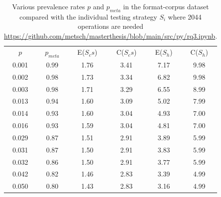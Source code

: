 \begin{table}[b]
    \caption{Various prevalence rates $p$ and $p_{meta}$ in the format-corpus dataset compared with the individual testing strategy $S_i$ where 2044 operations are needed \url{https://github.com/metsch/masterthesis/blob/main/src/py/rq3.ipynb}.}
    \centering
    \begin{tabular}{c c c c c c}
    \label{tb:split-off}
    $p$ & $p_{meta}$ & E($S_cs$) & C($S_cs$) & E($S_h$) & C($S_h$)\\
	0.001 &	0.99 &	1.76 & 3.41 &	7.17&	9.98 \\
	0.002 &	0.98 &	1.73 & 3.34 &	6.82&	9.98 \\
	0.003 &	0.98 &	1.71 & 3.29 &	6.55&	8.99 \\
	0.013 &	0.94 &	1.60 & 3.09 &	5.02&	7.99 \\
	0.014 &	0.93 &	1.60 & 3.04 &	4.93&	7.00 \\
	0.016 &	0.93 &	1.59 & 3.04 &	4.81&	7.00 \\
	0.029 &	0.87 &	1.51 & 2.91 &	3.89&	5.99 \\
	0.031 &	0.87 &	1.50 & 2.91 &	3.83&	5.99 \\
	0.032 &	0.86 &	1.50 & 2.91 &	3.77&	5.99 \\
    0.042 &	0.82 &	1.46 & 2.83 &	3.39&	4.99 \\
	0.050 &	0.80 &	1.43 & 2.83 &	3.16&	4.99
    \end{tabular}
\end{table}


